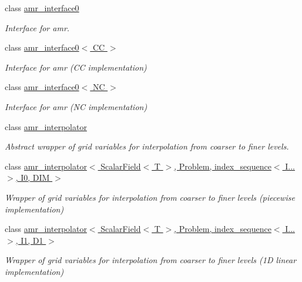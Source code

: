 \begin{DoxyCompactItemize}
class \hyperlink{classUintah_1_1PhaseField_1_1detail_1_1amr__interface0}{amr\+\_\+interface0}
\begin{DoxyCompactList}\small\item\em Interface for amr. \end{DoxyCompactList}\item 
class \hyperlink{classUintah_1_1PhaseField_1_1detail_1_1amr__interface0_3_01CC_01_4}{amr\+\_\+interface0$<$ C\+C $>$}
\begin{DoxyCompactList}\small\item\em Interface for amr (CC implementation) \end{DoxyCompactList}\item 
class \hyperlink{classUintah_1_1PhaseField_1_1detail_1_1amr__interface0_3_01NC_01_4}{amr\+\_\+interface0$<$ N\+C $>$}
\begin{DoxyCompactList}\small\item\em Interface for amr (NC implementation) \end{DoxyCompactList}\item 
class \hyperlink{classUintah_1_1PhaseField_1_1detail_1_1amr__interpolator}{amr\+\_\+interpolator}
\begin{DoxyCompactList}\small\item\em Abstract wrapper of grid variables for interpolation from coarser to finer levels. \end{DoxyCompactList}\item 
class \hyperlink{classUintah_1_1PhaseField_1_1detail_1_1amr__interpolator_3_01ScalarField_3_01T_01_4_00_01Problem64f2458f98b03e27672a091eecc4b696}{amr\+\_\+interpolator$<$ Scalar\+Field$<$ T $>$, Problem, index\+\_\+sequence$<$ I... $>$, I0, D\+I\+M $>$}
\begin{DoxyCompactList}\small\item\em Wrapper of grid variables for interpolation from coarser to finer levels (piecewise implementation) \end{DoxyCompactList}\item 
class \hyperlink{classUintah_1_1PhaseField_1_1detail_1_1amr__interpolator_3_01ScalarField_3_01T_01_4_00_01Problem71844444bc14a03c0566689b6b502040}{amr\+\_\+interpolator$<$ Scalar\+Field$<$ T $>$, Problem, index\+\_\+sequence$<$ I... $>$, I1, D1 $>$}
\begin{DoxyCompactList}\small\item\em Wrapper of grid variables for interpolation from coarser to finer levels (1D linear implementation) \end{DoxyCompactList}\item 

\end{DoxyCompactItemize}
